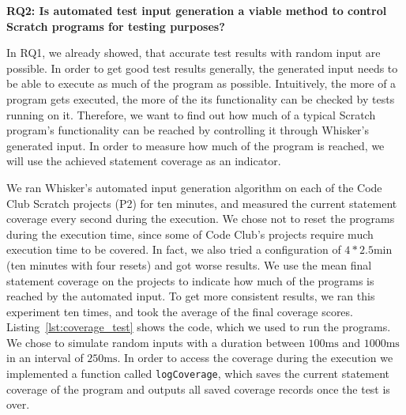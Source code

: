 \begin{center}\begin{minipage}{.9\textwidth}
    \textbf{RQ2: Is automated test input generation a viable method to control Scratch programs for testing purposes?}
\end{minipage}\end{center}

\noindent In RQ1, we already showed, that accurate test results with random input are possible.
In order to get good test results generally, the generated input needs to be able to execute as much of the program as possible.
Intuitively, the more of a program gets executed, the more of the its functionality can be checked by tests running on it.
Therefore, we want to find out how much of a typical Scratch program's functionality can be reached by controlling it through Whisker's generated input.
In order to measure how much of the program is reached, we will use the achieved statement coverage as an indicator.
\parspace

We ran Whisker's automated input generation algorithm on each of the Code Club Scratch projects (P2) for ten minutes,
and measured the current statement coverage every second during the execution.
We chose not to reset the programs during the execution time,
since some of Code Club's projects require much execution time to be covered.
In fact, we also tried a configuration of $4 * 2.5\text{min}$ (ten minutes with four resets)
and got worse results.
We use the mean final statement coverage on the projects to indicate how much of the programs is reached by the automated input.
To get more consistent results, we ran this experiment ten times, and took the average of the final coverage scores.
Listing~\ref{lst:coverage_test} shows the code, which we used to run the programs.
We chose to simulate random inputs with a duration between $100\text{ms}$ and $1000\text{ms}$ in an interval of $250\text{ms}$.
In order to access the coverage during the execution we implemented a function called \texttt{logCoverage},
which saves the current statement coverage of the program and outputs all saved coverage records once the test is over.
\parspace


